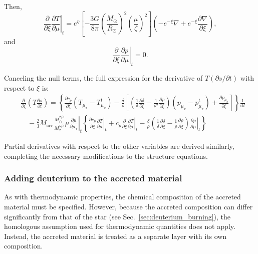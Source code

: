 \documentclass[12pt,a4paper]{article}
\newcommand{\mr}{\mathrm}
\newcommand{\pfird}[2][]{\frac{\partial#1}{\partial#2}}
\newcommand{\dd}[1]{\mathrm{d}#1}
\begin{document}
Then, 
\begin{equation}
  \pfird[]{\xi}\left.\pfird[T]{\mu}\right|_t = e^\eta\left[-\frac{3G}{8\pi}\left(\frac{M_\odot}{R_\odot}\right)^2\left(\frac{\mu}{\zeta}\right)^2\right]\left(-e^{-\xi}\nabla + e^{-\xi}\pfird[\nabla]{\xi}\right),
\end{equation}
and 
\begin{equation}
  \pfird[]{\xi}\left.\pfird[p]{\mu}\right|_t = 0.
\end{equation}

Canceling the null terms, the full expression for the derivative of $T(\partial s/\partial t)$ with respect to $\xi$ is:
\begin{align}
  &\pfird[]{\xi}\left(T\pfird[s]{t}\right) = \left\{\pfird[c_p]{\xi}\left(T_{\mu_x} - T_{\mu_x}^t\right) - \frac{\delta}{\rho}\left[\left(\frac{1}{\delta}\pfird[\delta]{\xi} - \frac{1}{\rho^2}\pfird[\rho]{\xi}\right)\left(p_{\mu_x} - p_{\mu_x}^t\right)  +\pfird[p_{\mu_x}]{\xi}\right]\right\}\frac{1}{\dd{t}}\\
  &\quad-\frac{2}{3}\dot{M}_\mr{acc}\frac{M_\odot^{2/3}}{M_2^{5/3}}\mu\left.\pfird[\mu]{\mu_x}\right|_t\left\{\pfird[c_p]{\xi}\left.\pfird[T]{\mu}\right|_t + c_p\pfird[]{\xi}\left.\pfird[T]{\mu}\right|_t - \frac{\delta}{\rho}\left(\frac{1}{\delta}\pfird[\delta]{\xi} - \frac{1}{\rho}\pfird[\rho]{\xi}\right)\left.\pfird[p]{\mu}\right|_t\right\}
\end{align}

Partial derivatives with respect to the other variables are derived similarly, completing the necessary modifications to the structure equations. 

\subsubsection{Adding deuterium to the accreted material}
\label{sec:accretion_deuterium}

As with thermodynamic properties, the chemical composition of the accreted material must be specified. However, because the accreted composition can differ significantly from that of the star (see Sec.~\ref{sec:deuterium_burning}), the homologous assumption used for thermodynamic quantities does not apply. Instead, the accreted material is treated as a separate layer with its own composition.
\end{document}
